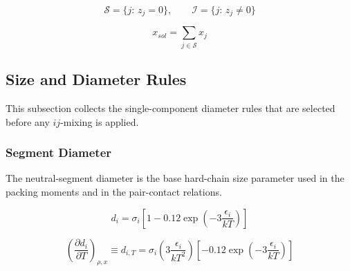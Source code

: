 \documentclass[12pt, letterpaper]{article}
\begin{document}
\begin{equation}
    \mathcal S=\{j:\,z_{j}=0\},\qquad \mathcal I=\{j:\,z_{j}\neq 0\}
    \label{eq:solvent_ion_sets}
\end{equation}


\begin{equation}
    x_{sol}=\sum_{j\in\mathcal S}x_{j}
    \label{eq:x_solvent_total}
\end{equation}

\subsection{Size and Diameter Rules}

This subsection collects the single-component diameter rules that are selected before any \(ij\)-mixing is applied.

\subsubsection{Segment Diameter}

The neutral-segment diameter is the base hard-chain size parameter used in the packing moments and in the pair-contact relations.

\begin{equation}
    d_{i}=\sigma_{i}\left[1-0.12 \exp \left(-3 \frac{\epsilon_{i}}{k T}\right)\right]
    \label{eq:d_segment}
\end{equation}


\begin{equation}
    \left(\frac{\partial d_i}{\partial T}\right)_{\rho,x}
    \equiv d_{i,T}
    =\sigma_{i}\left(3\frac{\epsilon_{i}}{kT^2}\right)\left[-0.12\exp\left(-3\frac{\epsilon_{i}}{kT}\right)\right]
    \label{eq:d_segment_dT}
\end{equation}
\end{document}
